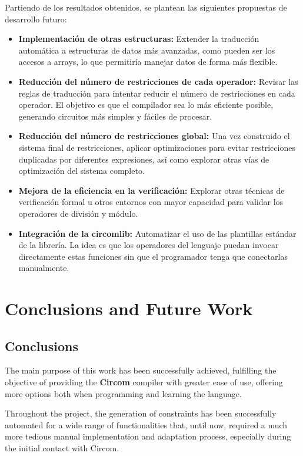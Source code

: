 \documentclass[a4paper,12pt]{report}
\begin{document}
	\noindent Partiendo de los resultados obtenidos, se plantean las siguientes propuestas de desarrollo futuro:
	\begin{itemize}
		\item \textbf{Implementación de otras estructuras:} Extender la traducción automática a estructuras de datos más avanzadas, como pueden ser los accesos a arrays, lo que permitiría manejar datos de forma más flexible.
		
		\item \textbf{Reducción del número de restricciones de cada operador:} Revisar las reglas de traducción para intentar reducir el número de restricciones en cada operador. El objetivo es que el compilador sea lo más eficiente posible, generando circuitos más simples y fáciles de procesar.
		
		\item \textbf{Reducción del número de restricciones global:} Una vez construido el sistema final de restricciones, aplicar optimizaciones para evitar restricciones duplicadas por diferentes expresiones, así como explorar otras vías de optimización del sistema completo.
		
		\item \textbf{Mejora de la eficiencia en la verificación:} Explorar otras técnicas de verificación formal u otros entornos con mayor capacidad para validar los operadores de división y módulo.
		
		
		\item \textbf{Integración de la circomlib:} Automatizar el uso de las plantillas estándar de la librería. La idea es que los operadores del lenguaje puedan invocar directamente estas funciones sin que el programador tenga que conectarlas manualmente.
	\end{itemize}
	
	\chapter{Conclusions and Future Work}
	\section{Conclusions}
	
	\noindent The main purpose of this work has been successfully achieved, fulfilling the objective of providing the \textbf{Circom} compiler with greater ease of use, offering more options both when programming and learning the language.
	
	\vspace{0.2cm}
	\noindent
	Throughout the project, the generation of constraints has been successfully automated for a wide range of functionalities that, until now, required a much more tedious manual implementation and adaptation process, especially during the initial contact with Circom.
	
\end{document}
